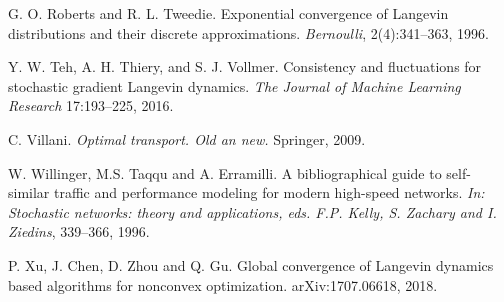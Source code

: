 \documentclass[a4paper]{article}
\begin{document}
\begin{thebibliography}{00}
G. O. Roberts and R. L. Tweedie.
\newblock Exponential convergence of Langevin distributions and their discrete approximations.
\newblock \emph{Bernoulli}, 2(4):341--363, 1996.

 Y. W. Teh, A. H. Thiery, and S. J. Vollmer.
\newblock Consistency and fluctuations for stochastic gradient Langevin dynamics.
\newblock \emph{The Journal of Machine Learning Research} 17:193--225, 2016.

 C. Villani.
\newblock \emph{Optimal transport. Old an new.}
\newblock Springer, 2009.

 W. Willinger, M.S. Taqqu and A. Erramilli.
\newblock A bibliographical guide to self-similar traffic and
performance modeling for modern high-speed networks.
\newblock\emph{In: Stochastic networks: theory and applications,
eds. F.P. Kelly, S. Zachary and I. Ziedins}, 339--366, 1996.

 P. Xu, J. Chen, D. Zhou and Q. Gu.
\newblock Global convergence of Langevin dynamics based
algorithms for nonconvex optimization.
\newblock arXiv:1707.06618, 2018.







\end{thebibliography}
\end{document}
